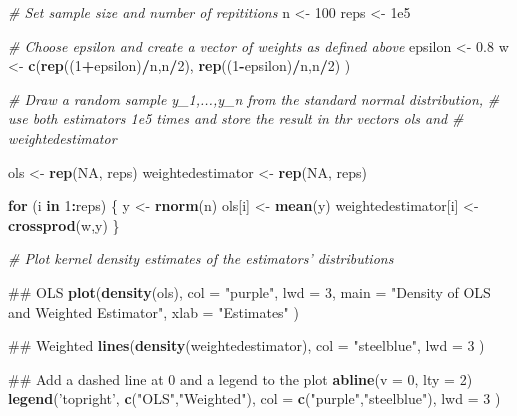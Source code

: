 \documentclass[]{book}
\newenvironment{Shaded}{\begin{snugshade}}{\end{snugshade}}
\newcommand{\KeywordTok}[1]{\textcolor[rgb]{0.13,0.29,0.53}{\textbf{#1}}}
\newcommand{\DataTypeTok}[1]{\textcolor[rgb]{0.13,0.29,0.53}{#1}}
\newcommand{\DecValTok}[1]{\textcolor[rgb]{0.00,0.00,0.81}{#1}}
\newcommand{\FloatTok}[1]{\textcolor[rgb]{0.00,0.00,0.81}{#1}}
\newcommand{\StringTok}[1]{\textcolor[rgb]{0.31,0.60,0.02}{#1}}
\newcommand{\CommentTok}[1]{\textcolor[rgb]{0.56,0.35,0.01}{\textit{#1}}}
\newcommand{\OtherTok}[1]{\textcolor[rgb]{0.56,0.35,0.01}{#1}}
\newcommand{\ControlFlowTok}[1]{\textcolor[rgb]{0.13,0.29,0.53}{\textbf{#1}}}
\newcommand{\OperatorTok}[1]{\textcolor[rgb]{0.81,0.36,0.00}{\textbf{#1}}}
\newcommand{\NormalTok}[1]{#1}
\theoremstyle{definition}
\theoremstyle{definition}
\theoremstyle{definition}
\theoremstyle{remark}
\begin{document}
\begin{Shaded}
\begin{Highlighting}[]
\CommentTok{# Set sample size and number of repititions}
\NormalTok{n <-}\StringTok{ }\DecValTok{100}      
\NormalTok{reps <-}\StringTok{ }\FloatTok{1e5}

\CommentTok{# Choose epsilon and create a vector of weights as defined above}
\NormalTok{epsilon <-}\StringTok{ }\FloatTok{0.8}
\NormalTok{w <-}\StringTok{ }\KeywordTok{c}\NormalTok{(}\KeywordTok{rep}\NormalTok{((}\DecValTok{1}\OperatorTok{+}\NormalTok{epsilon)}\OperatorTok{/}\NormalTok{n,n}\OperatorTok{/}\DecValTok{2}\NormalTok{), }
       \KeywordTok{rep}\NormalTok{((}\DecValTok{1}\OperatorTok{-}\NormalTok{epsilon)}\OperatorTok{/}\NormalTok{n,n}\OperatorTok{/}\DecValTok{2}\NormalTok{) }
\NormalTok{      )}

\CommentTok{# Draw a random sample y_1,...,y_n from the standard normal distribution, }
\CommentTok{# use both estimators 1e5 times and store the result in thr vectors ols and }
\CommentTok{# weightedestimator}

\NormalTok{ols <-}\StringTok{ }\KeywordTok{rep}\NormalTok{(}\OtherTok{NA}\NormalTok{, reps)}
\NormalTok{weightedestimator <-}\StringTok{ }\KeywordTok{rep}\NormalTok{(}\OtherTok{NA}\NormalTok{, reps)}

\ControlFlowTok{for}\NormalTok{ (i }\ControlFlowTok{in} \DecValTok{1}\OperatorTok{:}\NormalTok{reps) \{}
\NormalTok{  y <-}\StringTok{ }\KeywordTok{rnorm}\NormalTok{(n)}
\NormalTok{  ols[i] <-}\StringTok{ }\KeywordTok{mean}\NormalTok{(y)}
\NormalTok{  weightedestimator[i] <-}\StringTok{ }\KeywordTok{crossprod}\NormalTok{(w,y)}
\NormalTok{\}}

\CommentTok{# Plot kernel density estimates of the estimators' distributions }

\NormalTok{## OLS}
\KeywordTok{plot}\NormalTok{(}\KeywordTok{density}\NormalTok{(ols), }
     \DataTypeTok{col =} \StringTok{"purple"}\NormalTok{, }
     \DataTypeTok{lwd =} \DecValTok{3}\NormalTok{, }
     \DataTypeTok{main =} \StringTok{"Density of OLS and Weighted Estimator"}\NormalTok{,}
     \DataTypeTok{xlab =} \StringTok{"Estimates"}
\NormalTok{     )}

\NormalTok{## Weighted}
\KeywordTok{lines}\NormalTok{(}\KeywordTok{density}\NormalTok{(weightedestimator), }
      \DataTypeTok{col =} \StringTok{"steelblue"}\NormalTok{, }
      \DataTypeTok{lwd =} \DecValTok{3}
\NormalTok{      ) }

\NormalTok{## Add a dashed line at 0 and a legend to the plot}
\KeywordTok{abline}\NormalTok{(}\DataTypeTok{v =} \DecValTok{0}\NormalTok{, }\DataTypeTok{lty =} \DecValTok{2}\NormalTok{)}
\KeywordTok{legend}\NormalTok{(}\StringTok{'topright'}\NormalTok{, }
       \KeywordTok{c}\NormalTok{(}\StringTok{"OLS"}\NormalTok{,}\StringTok{"Weighted"}\NormalTok{), }
       \DataTypeTok{col =} \KeywordTok{c}\NormalTok{(}\StringTok{"purple"}\NormalTok{,}\StringTok{"steelblue"}\NormalTok{), }
       \DataTypeTok{lwd =} \DecValTok{3}
\NormalTok{       )}
\end{Highlighting}
\end{Shaded}
\end{document}
